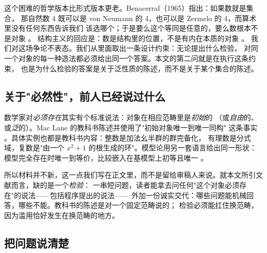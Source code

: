 \documentclass[aps,prd,preprint,superscriptaddress,amsmath,amssymb]{revtex4-2}
\begin{document}
这个困难的哲学版本比形式版本更老。Benacerraf（1965）指出：如果数就是集合，
那自然数 4 既可以是 von Neumann 的 4，也可以是 Zermelo 的 4，而算术里没有任何东西告诉我们
该选哪个；于是要么这个等同是任意的，要么数根本不是对象 \cite{benacerraf1965}。
结构主义的回应是：数是结构里的位置，不是有内在本质的对象 \cite{shapiro1997}。
我们对这场争论不表态。我们从里面取出一条设计约束：无论提出什么检验，
对同一个对象的每一种造法都必须给出同一个答案。本文的第二问就是在执行这条约束，
也是为什么检验的答案是关于泛性质的陈述，而不是关于某个集合的陈述。

\subsection*{关于"必然性"，前人已经说过什么}

数学家对\emph{必须存在}其实有个标准说法：对象在相应范畴里是\emph{初始}的
（或\emph{自由}的、或\emph{泛}的）。Mac Lane 的教科书陈述并使用了"初始对象唯一到唯一同构"
这条事实 \cite{MacLane1971}。具体实例也都是教科书内容：整数是加法幺半群的群完备化，
有理数是分式域，复数是"由一个 $x^2+1$ 的根生成的环"。模型论用另一套语言给出同一形状：模型完全存在时唯一到等价，比较嵌入在基模型上初等且唯一 \cite{EklofSabbagh1971,Hodges1993}。

所以材料并不新，这一点我们写在正文里，而不是留给审稿人来说。就本文所引文献而言，缺的是一个\emph{检验}：
一串短问题，读者能拿去问任何"这个对象必须存在"的说法——包括程序提出的说法——
外加一份诚实交代：哪些问题能机械回答，哪些不能。教科书的陈述是对一个固定范畴说的；
检验必须能扛住换范畴，因为滥用恰好发生在换范畴的地方。

\subsection*{把问题说清楚}
\end{document}
